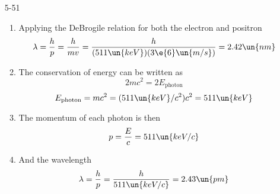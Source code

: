 \documentclass[]{2620hw}
\begin{document}
\begin{enumerate}
\item [5-51]
\begin{enumerate}
    \item Applying the DeBrogile relation for both the electron and positron
	\[
		\lambda = \frac{h}{p} = \frac{h}{mv} = \frac{h}{(511\un{keV})(3\e{6}\un{m/s})} = 2.42 \un{nm}
	\]
	\item The conservation of energy can be written as
	\[
		2mc^2 = 2E_{\text{photon}}
	\]
	\[
		E_{\text{photon}} = mc^2 = (511\un{keV}/c^2)c^2 = 511\un{keV}
	\]
	\item The momentum of each photon is then 
	\[
		p = \frac{E}{c} = 511\un{keV/c}
	\]
	\item And the wavelength
	\[
		\lambda = \frac{h}{p} = \frac{h}{511\un{keV/c}} = 2.43 \un{pm}
	\]
	
\end{enumerate}

\end{enumerate}
\end{document}
